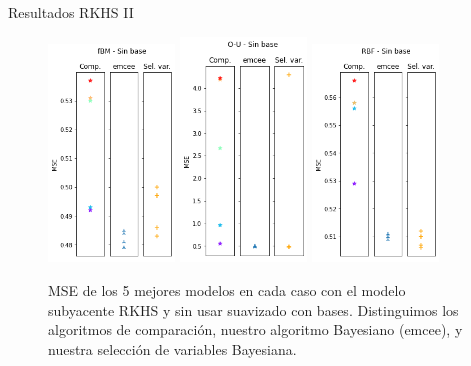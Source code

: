 \documentclass[10pt, spanish, professionalfonts]{beamer}
\begin{document}
\begin{frame}{Resultados RKHS II}
  \begin{figure}
    \includegraphics[width=0.3\textwidth]{img/results/lin_rkhs_fbm_nobase}\hfill
    \includegraphics[width=0.3\textwidth]{img/results/lin_rkhs_ou_nobase}\hfill
    \includegraphics[width=0.3\textwidth]{img/results/lin_rkhs_rbf_nobase}
    \caption{MSE de los 5 mejores modelos en cada caso con el modelo subyacente RKHS y sin usar suavizado con bases. Distinguimos los algoritmos de comparación, nuestro algoritmo Bayesiano (emcee), y nuestra selección de variables Bayesiana.}
  \end{figure}
\end{frame}
\end{document}
